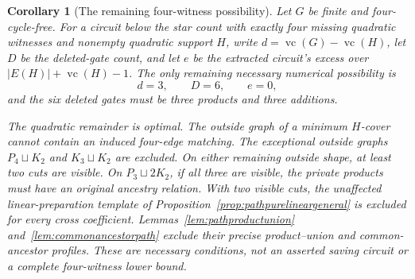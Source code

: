 \documentclass[11pt]{article}
\newcommand{\vc}{\operatorname{vc}}
\newtheorem{corollary}[theorem]{Corollary}
\theoremstyle{definition}
\theoremstyle{remark}
\begin{document}
\begin{corollary}[The remaining four-witness possibility]\label{cor:fourresidualfinal}
Let $G$ be finite and four-cycle-free. For a circuit below the star count with exactly four missing quadratic witnesses and nonempty quadratic support $H$, write $d=\vc(G)-\vc(H)$, let $D$ be the deleted-gate count, and let $e$ be the extracted circuit's excess over $|E(H)|+\vc(H)-1$. The only remaining necessary numerical possibility is
\[
 d=3,\qquad D=6,\qquad e=0,
\]
and the six deleted gates must be three products and three additions.

The quadratic remainder is optimal. The outside graph of a minimum $H$-cover cannot contain an induced four-edge matching. The exceptional outside graphs $P_4\sqcup K_2$ and $K_3\sqcup K_2$ are excluded. On either remaining outside shape, at least two cuts are visible. On $P_3\sqcup2K_2$, if all three are visible, the private products must have an original ancestry relation. With two visible cuts, the unaffected linear-preparation template of Proposition~\ref{prop:pathpurelineargeneral} is excluded for every cross coefficient. Lemmas~\ref{lem:pathproductunion} and~\ref{lem:commonancestorpath} exclude their precise product--union and common-ancestor profiles. These are necessary conditions, not an asserted saving circuit or a complete four-witness lower bound.
\end{corollary}
\end{document}
